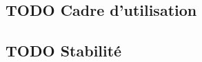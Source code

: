 \documentclass[letter]{article}
\begin{document}
\subsection{{\bfseries\sffamily TODO} Cadre d'utilisation}
\label{sec:orgfb02acb}





\subsection{{\bfseries\sffamily TODO} Stabilité}
\label{sec:orgb1d1ab6}
\end{document}
